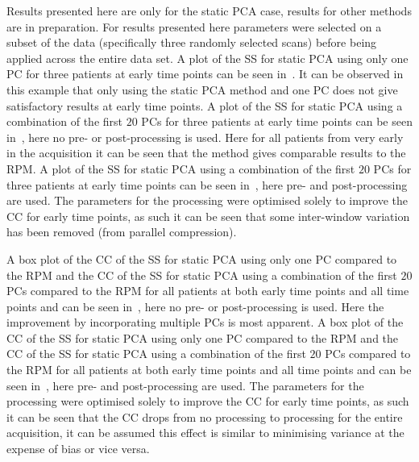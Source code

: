             Results presented here are only for the static \gls{PCA} case, results for other methods are in preparation. For results presented here parameters were selected on a subset of the data (specifically three randomly selected scans) before being applied across the entire data set. A plot of the \gls{SS} for static \gls{PCA} using only one \gls{PC} for three patients at early time points can be seen in~. It can be observed in this example that only using the static \gls{PCA} method and one \gls{PC} does not give satisfactory results at early time points. A plot of the \gls{SS} for static \gls{PCA} using a combination of the first $20$ \glspl{PC} for three patients at early time points can be seen in~, here no pre- or post-processing is used. Here for all patients from very early in the acquisition it can be seen that the method gives comparable results to the \gls{RPM}. A plot of the \gls{SS} for static \gls{PCA} using a combination of the first $20$ \glspl{PC} for three patients at early time points can be seen in~, here pre- and post-processing are used. The parameters for the processing were optimised solely to improve the \gls{CC} for early time points, as such it can be seen that some inter-window variation has been removed (from parallel compression).
            
            A box plot of the \gls{CC} of the \gls{SS} for static \gls{PCA} using only one \gls{PC} compared to the \gls{RPM} and the \gls{CC} of the \gls{SS} for static \gls{PCA} using a combination of the first $20$ \glspl{PC} compared to the \gls{RPM} for all patients at both early time points and all time points and  can be seen in~, here no pre- or post-processing is used. Here the improvement by incorporating multiple \glspl{PC} is most apparent. A box plot of the \gls{CC} of the \gls{SS} for static \gls{PCA} using only one \gls{PC} compared to the \gls{RPM} and the \gls{CC} of the \gls{SS} for static \gls{PCA} using a combination of the first $20$ \glspl{PC} compared to the \gls{RPM} for all patients at both early time points and all time points and  can be seen in~, here pre- and post-processing are used. The parameters for the processing were optimised solely to improve the \gls{CC} for early time points, as such it can be seen that the \gls{CC} drops from no processing to processing for the entire acquisition, it can be assumed this effect is similar to minimising variance at the expense of bias or vice versa.
            
